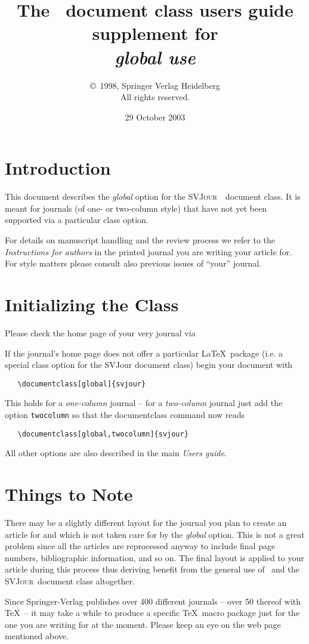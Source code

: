 \documentclass[draft]{ltxguide}[1995/11/28]
\title{The \SJour\ document class users guide\\supplement
for\\\textit{global use}}
\author{\copyright~1998, Springer Verlag Heidelberg\\
   All rights reserved.}
\date{29 October 2003}
\newcommand{\SJour}{\textsc{SVJour}}
\begin{document}
\maketitle

\section{Introduction}
\label{sec:intro}
This document describes the \textit{global} option for the \SJour\
\LaTeXe\ document class. It is meant for journals (of one- or two-column
style) that have not yet been supported via a particular class option.

For details on manuscript handling and the review process we refer to
the \emph{Instructions for authors} in the printed journal you are
writing your article for. For style matters please consult also previous
issues of ``your'' journal.

\section{Initializing the Class}
\label{sec:opt}

Please check the home page of your very journal via\\[3pt]
\null\hspace{5mm}\hbox{}

\medskip
If the journal's home page does not offer a particular \LaTeX\
package (i.e. a special class option for the SVJour document class)
begin your document with
\begin{verbatim}
   \documentclass[global]{svjour}
\end{verbatim}
This holds for a \emph{one-column} journal -- for a \emph{two-column}
journal just add the option \verb|twocolumn| so that the documentclass
command now reads
\begin{verbatim}
   \documentclass[global,twocolumn]{svjour}
\end{verbatim}
All other options are also described
in the main \emph{Users guide}.

\section{Things to Note}

There may be a slightly different layout for the journal you plan to
create an article for and which is not taken care for by the
\emph{global} option. This is not a great problem since all the articles
are reprocessed anyway to include final page numbers, bibliographic
information, and so on. The final layout is applied to your article
during this process thus deriving benefit from the general use of
\LaTeXe\ and the \SJour\ document class altogether.

Since Springer-Verlag publishes over 400 different journals -- over 50
thereof with \TeX\ -- it may take a while to produce a specific \TeX\
macro package just for the one you are writing for at the moment. Please
keep an eye on the web page mentioned above.
\end{document}
